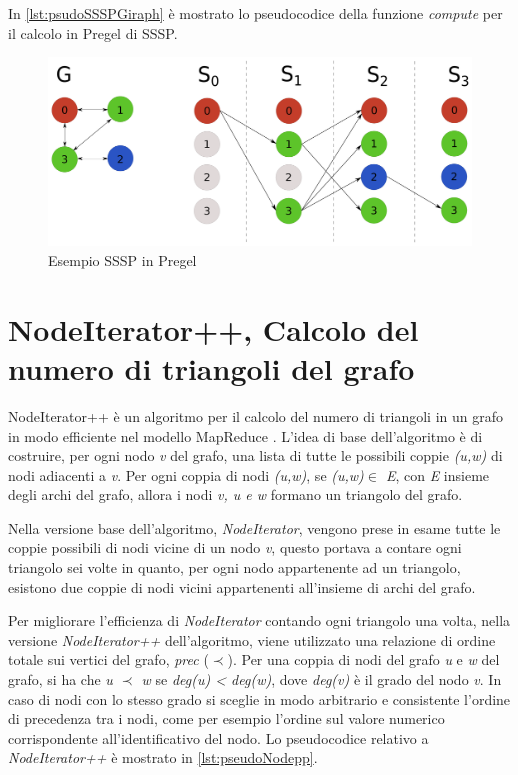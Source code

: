 \documentclass[LaM,binding=0.6cm]{sapthesis}
\begin{document}
In \ref{lst:psudoSSSPGiraph} è mostrato lo pseudocodice della funzione \textit{compute} per il calcolo in Pregel di SSSP.



\begin{figure}
\centering
\includegraphics[width=1\textwidth]{PREGEL-SSSP}
\caption{Esempio SSSP in Pregel}
\label{fig:PREGELSSSP}
\end{figure}


\begin{minipage}{\linewidth}
	
\end{minipage}


\section{NodeIterator++, Calcolo del numero di triangoli del grafo}

NodeIterator++ \cite{Suri:2011:CTC:1963405.1963491} è un algoritmo per il calcolo del numero di triangoli in un grafo in modo efficiente nel modello MapReduce \cite{Dean:2008:MSD:1327452.1327492}.
L'idea di base dell'algoritmo è di costruire, per ogni nodo \textit{v} del grafo, una lista di tutte le possibili coppie \textit{(u,w)} di nodi adiacenti a \textit{v}. Per ogni coppia di nodi \textit{(u,w)}, se \textit{(u,w)$\in$ E}, con \textit{E} insieme degli archi del grafo, allora i nodi \textit{ v, u e w } formano un triangolo del grafo.
 
Nella versione base dell'algoritmo, \textit{NodeIterator}, vengono prese in esame tutte le coppie possibili di nodi vicine di un nodo \textit{v}, questo portava a contare ogni triangolo sei volte in quanto, per ogni nodo appartenente ad un triangolo, esistono due coppie di nodi vicini appartenenti all'insieme di archi del grafo.

Per migliorare l'efficienza di \textit{NodeIterator} contando ogni triangolo una volta, nella versione \textit{NodeIterator++} dell'algoritmo, viene utilizzato una relazione di ordine totale sui vertici del grafo, \textit{prec} ($\prec$). Per una coppia di nodi del grafo \textit{u} e \textit{w} del grafo, si ha che \textit{u $\prec$ w} se \textit{deg(u) < deg(w)}, dove \textit{deg(v)} è il grado del nodo \textit{v}. In caso di nodi con lo stesso grado si sceglie in modo arbitrario e consistente l'ordine di precedenza tra i nodi, come per esempio l'ordine sul valore numerico corrispondente all'identificativo del nodo. Lo pseudocodice  relativo a \textit{NodeIterator++} è mostrato in \ref{lst:pseudoNodepp}.
\end{document}
